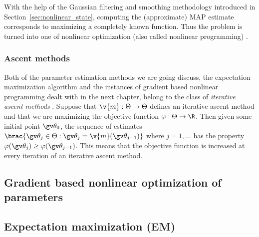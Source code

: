 With the help of the Gaussian filtering and smoothing methodology introduced in 
Section~\ref{sec:nonlinear_state}, computing the (approximate) MAP estimate 
corresponds to maximizing a completely known function.
Thus the problem is turned into one of nonlinear optimization 
(also called nonlinear programming) \parencite{Cappe2005}.

\subsubsection{Ascent methods}

Both of the parameter estimation methods we are going
discuss, the expectation maximization algorithm and
the instances of gradient based nonlinear programming dealt with in the
next chapter, belong to the class of \emph{iterative ascent methods} \parencite{luenberger2008}.
Suppose that $\v{m}:\Theta \to \Theta$ defines an iterative ascent method
and that we are maximizing the objective function $\varphi:\Theta\to\R$.
Then given some initial point $\Th_0$, the sequence of estimates
$\brac{\Th_j \in \Theta: \Th_j=\v{m}(\Th_{j-1})}$ where $j=1,\dots$
has the property $\varphi(\Th_{j})\geq \varphi(\Th_{j-1})$. This means
that the objective function is increased at every iteration of
an iterative ascent method.

\subsection{Gradient based nonlinear optimization of parameters}\label{sec:grad}%


\subsection{Expectation maximization (EM)}\label{sec:em}%


% 



